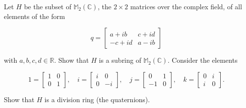 Let $H$ be the subset of $\mathbb{M}_2(\mathbb{C})$, the $2 \times 2$ matrices over the complex field, of all elements of the form

$$q = \begin{bmatrix} a + ib & c + id \\ -c + id & a - ib \end{bmatrix}$$

with $a, b, c, d \in \mathbb{R}$. Show that $H$ is a subring of $\mathbb{M}_2(\mathbb{C})$. Consider the elements

$$1 = \begin{bmatrix} 1 & 0 \\ 0 & 1 \end{bmatrix}, \quad i = \begin{bmatrix} i & 0 \\ 0 & -i \end{bmatrix}, \quad j = \begin{bmatrix} 0 & 1 \\ -1 & 0 \end{bmatrix}, \quad k = \begin{bmatrix} 0 & i \\ i & 0 \end{bmatrix}.$$

Show that $H$ is a division ring (the quaternions).
